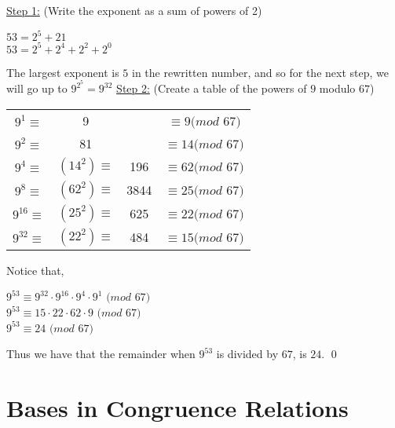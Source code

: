 \documentclass[../main.tex]{subfiles}
\begin{document}
\begin{ans}
    \underline{Step 1:} (Write the exponent as a sum of powers of 2)
    \begin{center}
        $53 = 2^5 + 21$ \\
        $53 = 2^5 + 2^4 + 2^2 + 2^0$
    \end{center}
    The largest exponent is $5$ in the rewritten number, and so for the next step, we will go up to $9^{2^5} = 9^{32}$ \sspace
    \underline{Step 2:} (Create a table of the powers of $9$ modulo $67$)
    \begin{center}
        \begin{tabular}{c c c c}
            $9^1\equiv$&9& &$\equiv 9 (mod$ $67)$ \\
            $9^2\equiv$&81& &$\equiv 14 (mod$ $67)$ \\
            $9^4\equiv$&$(14^2) \equiv$&196&$\equiv 62 (mod$ $67)$ \\
            $9^8\equiv$&$(62^2) \equiv$&3844&$\equiv 25 (mod$ $67)$ \\
            $9^{16}\equiv$&$(25^2) \equiv$&625&$\equiv 22 (mod$ $67)$ \\
            $9^{32}\equiv$&$(22^2) \equiv$&484&$\equiv 15 (mod$ $67)$ \\
        \end{tabular}
    \end{center}
    Notice that, 
    \begin{center}
        $9^{53} \equiv 9^{32} \cdot 9^{16} \cdot 9^{4} \cdot 9^{1}$ $(mod$ $67)$ \\
        $9^{53} \equiv 15 \cdot 22 \cdot 62 \cdot 9$ $(mod$ $67)$ \\
        $9^{53} \equiv 24$ $(mod$ $67)$
    \end{center}
    Thus we have that the remainder when $9^{53}$ is divided by $67$, is $24$. \qed
\end{ans}


\section{Bases in Congruence Relations}
\end{document}
